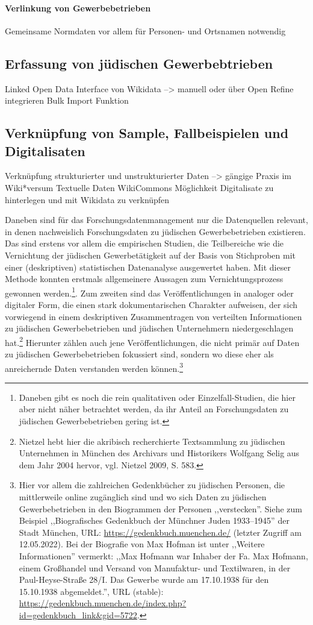\paragraph{Verlinkung von Gewerbebetrieben}
Gemeinsame Normdaten vor allem für Personen- und Ortsnamen notwendig
\subsection{Erfassung von jüdischen Gewerbebtrieben}
Linked Open Data Interface von Wikidata --> manuell oder über Open Refine integrieren Bulk Import Funktion
\subsection{Verknüpfung von Sample, Fallbeispielen und Digitalisaten}
Verknüpfung strukturierter und unstrukturierter Daten --> gängige Praxis im Wiki*versum
Textuelle Daten
WikiCommons Möglichkeit Digitalisate zu hinterlegen und mit Wikidata zu verknüpfen

Daneben sind für das Forschungsdatenmanagement nur die Datenquellen relevant, in denen nachweislich Forschungsdaten zu jüdischen Gewerbebetrieben existieren. Das sind erstens vor allem die empirischen Studien, die Teilbereiche wie die Vernichtung der jüdischen Gewerbetätigkeit auf der Basis von Stichproben mit einer (deskriptiven) statistischen Datenanalyse ausgewertet haben. Mit dieser Methode konnten erstmals allgemeinere Aussagen zum Vernichtungsprozess gewonnen werden.\footnote{Daneben gibt es noch die rein qualitativen oder Einzelfall-Studien, die hier aber nicht näher betrachtet werden, da ihr Anteil an Forschungsdaten zu jüdischen Gewerbebetrieben gering ist.}. Zum zweiten sind das Veröffentlichungen in analoger oder digitaler Form, die einen stark dokumentarischen Charakter aufweisen, der sich vorwiegend in einem deskriptiven Zusammentragen von verteilten Informationen zu jüdischen Gewerbebetrieben und jüdischen Unternehmern niedergeschlagen hat.\footnote{Nietzel hebt hier die akribisch recherchierte Textsammlung zu jüdischen Unternehmen in München des Archivars und Historikers Wolfgang Selig aus dem Jahr 2004 hervor, vgl. Nietzel 2009, S. 583.} Hierunter zählen auch jene Veröffentlichungen, die nicht primär auf Daten zu jüdischen Gewerbebetrieben fokussiert sind, sondern wo diese eher als anreichernde Daten verstanden werden können.\footnote{Hier vor allem die zahlreichen Gedenkbücher zu jüdischen Personen, die mittlerweile online zugänglich sind und wo sich Daten zu jüdischen Gewerbebetrieben in den Biogrammen der Personen ,,verstecken''. Siehe zum Beispiel ,,Biografisches Gedenkbuch der Münchner Juden 1933–1945'' der Stadt München, URL: \url{https://gedenkbuch.muenchen.de/} (letzter Zugriff am 12.05.2022). Bei der Biografie von Max Hofman ist unter ,,Weitere Informationen'' vermerkt: ,,Max Hofmann war Inhaber der Fa. Max Hofmann, einem Großhandel und Versand von Manufaktur- und Textilwaren, in der Paul-Heyse-Straße 28/I. Das Gewerbe wurde am 17.10.1938 für den 15.10.1938 abgemeldet.'', URL (stable): \url{https://gedenkbuch.muenchen.de/index.php?id=gedenkbuch_link&gid=5722}.}


